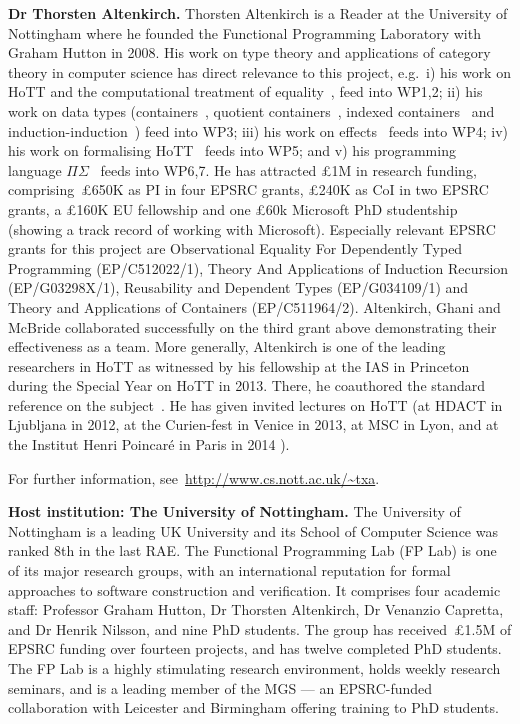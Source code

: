 \documentclass[a4paper,11pt]{article}
\newcommand{\eg}{{e.g.}\ }
\begin{document}
\newpage \textbf{Dr Thorsten Altenkirch.}  Thorsten Altenkirch is a
Reader at the University of Nottingham where he founded the Functional
Programming Laboratory with Graham Hutton in 2008. His work on type
theory and applications of category theory in computer science has
direct relevance to this project, \eg i) his work on HoTT and the
computational treatment of
equality~\cite{altenkirch:extSetoids,alti:ott-conf,alti:csl12,alti:tlca13-hedberg},
feed into WP1,2; ii) his work on data types
(containers~\cite{alti:cont-tcs}, quotient
containers~\cite{alti:mpc04}, indexed
containers~\cite{altenkirchGhaniHancockMcBrideMorris:indexedContainers}
and induction-induction~\cite{alti:catind2}) feed into WP3; iii) his
work on effects~\cite{alti:beast} feeds into WP4; iv) his work on
formalising HoTT~\cite{alti:csl12,alti:tlca13-hedberg} feeds into WP5;
and v) his programming language $\Pi\Sigma$~\cite{alti:pisigma-new}
feeds into WP6,7. He has attracted \pounds 1M in research funding,
comprising~\pounds650K as PI in four EPSRC grants, \pounds240K as CoI
in two EPSRC grants, a \pounds160K EU fellowship and one \pounds 60k
Microsoft PhD studentship (showing a track record of working with
Microsoft). Especially relevant EPSRC grants for this project are
Observational Equality For Dependently Typed Programming
(EP/C512022/1), Theory And Applications of Induction Recursion
(EP/G03298X/1), Reusability and Dependent Types (EP/G034109/1) and
Theory and Applications of Containers (EP/C511964/2).  Altenkirch,
Ghani and McBride collaborated successfully on the third grant above
demonstrating their effectiveness as a team. More generally,
Altenkirch is one of the leading researchers in HoTT as witnessed by
his fellowship at the IAS in Princeton during the Special Year on HoTT
in 2013. There, he coauthored the standard reference on the
subject~\cite{hott-book}.  He has given invited lectures on HoTT (at
HDACT in Ljubljana in 2012, at the Curien-fest in Venice in 2013, at
MSC in Lyon, and at the Institut Henri Poincar\'e in Paris in 2014
\cite{txa-ihp14}).

For further information, see~\url{http://www.cs.nott.ac.uk/~txa}.

\textbf{Host institution: The University of Nottingham.}  The
University of Nottingham is a leading UK University and its School of
Computer Science was ranked 8th in the last RAE. The Functional
Programming Lab (FP Lab) is one of its major research groups, with an
international reputation for formal approaches to software
construction and verification.  It comprises four academic staff:
Professor Graham Hutton, Dr Thorsten Altenkirch, Dr Venanzio Capretta,
and Dr Henrik Nilsson, and nine PhD students.  The group has
received~\pounds1.5M of EPSRC funding over fourteen projects, and has
twelve completed PhD students.  The FP Lab is a highly
stimulating research environment, holds weekly research seminars, and
is a leading member of the MGS --- an EPSRC-funded
collaboration with Leicester and Birmingham offering training to PhD
students.
\noindent
\end{document}

